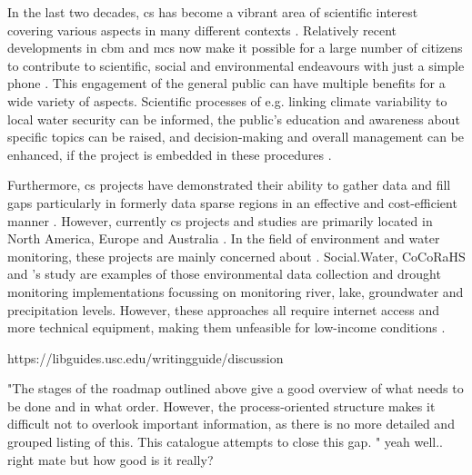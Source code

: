 In the last two decades, \acrlong{cs} has become a vibrant area of scientific interest covering various aspects in many different contexts \autocite{kirschkeCitizenScienceProjects2022,kullenbergWhatCitizenScience2016}. Relatively recent developments in \acrlong{cbm} and \acrlong{mcs} now make it possible for a large number of citizens to contribute to scientific, social and environmental endeavours with just a simple phone \autocite{butteFrameworkWaterSecurity2022}. This engagement of the general public can have multiple benefits for a wide variety of aspects. Scientific processes of e.g. linking climate variability to local water security can be informed, the public's education and awareness about specific topics can be raised, and decision-making and overall management can be enhanced, if the project is embedded in these procedures \autocite{huangManagementDrinkingWater2020,kirschkeCitizenScienceProjects2022,minkmanCitizenScienceWater2015}.


Furthermore, \acrshort{cs} projects have demonstrated their ability to gather data and fill gaps particularly in formerly data sparse regions in an effective and cost-efficient manner \autocite{butteFrameworkWaterSecurity2022,lackstromBackyardHydroclimatologyCitizen2022,weeserCitizenSciencePioneers2018a}. However, currently \acrshort{cs} projects and studies are primarily located in North America, Europe and Australia \autocite{kirschkeCitizenScienceProjects2022, koehlerCitizenParticipationCollaborative2008, livinglakescanadaElevatingCommunityBased2018}. In the field of environment and water monitoring, these projects are mainly concerned about  \autocite{kirschkeCitizenScienceProjects2022}. Social.Water, CoCoRaHS and \autocite{speirSolutionsCurrentChallenges2022}'s study are examples of those environmental data collection and drought monitoring implementations focussing on monitoring river, lake, groundwater and precipitation levels. However, these approaches all require internet access and more technical equipment, making them unfeasible for low-income conditions \autocite{fienenSocialWaterCrowdsourcing2012a,lackstromBackyardHydroclimatologyCitizen2022,lowryGrowingPainsCrowdsourced2019}.\newline



https://libguides.usc.edu/writingguide/discussion

"The stages of the roadmap outlined above give a good overview of what needs to be done and in what order. However, the process-oriented structure makes it difficult not to overlook important information, as there is no more detailed and grouped listing of this. This catalogue attempts to close this gap. " yeah well.. right mate but how good is it really?


